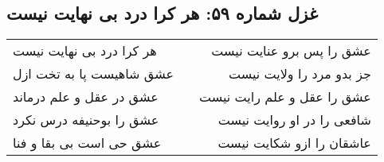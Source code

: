 \begin{center}
\section*{غزل شماره ۵۹: هر کرا درد بی نهایت نیست}
\label{sec:059}
\begin{longtable}{l p{0.5cm} r}
هر کرا درد بی نهایت نیست
&&
عشق را پس برو عنایت نیست
\\
عشق شاهیست پا به تخت ازل
&&
جز بدو مرد را ولایت نیست
\\
عشق در عقل و علم درماند
&&
عشق را عقل و علم رایت نیست
\\
عشق را بوحنیفه درس نکرد
&&
شافعی را در او روایت نیست
\\
عشق حی است بی بقا و فنا
&&
عاشقان را ازو شکایت نیست
\\
\end{longtable}
\end{center}
